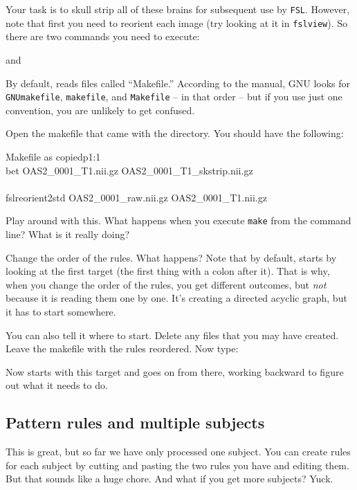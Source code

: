Your task is to skull strip all of these brains for subsequent use by \texttt{FSL}. However, note that first you need to reorient each image (try looking at it in \texttt{fslview}). So there are two commands you need to execute:

and

By default, \maken{} reads files called ``Makefile.'' According to the manual, GNU looks for \texttt{GNUmakefile}, \texttt{makefile}, and \texttt{Makefile} -- in that order -- but if you use just one convention, you are unlikely to get confused. 

Open the makefile that came with the directory. You should have the following:

\begin{make}{Makefile as copied}{p1:1}
	 \\
	\tab bet OAS2_0001_T1.nii.gz OAS2_0001_T1_skstrip.nii.gz \\
	
	\\
	\tab fslreorient2std OAS2_0001_raw.nii.gz OAS2_0001_T1.nii.gz
\end{make}

Play around with this. What happens when you execute \texttt{make} from the command line? What is it really doing?

Change the order of the rules. What happens? Note that by default, \maken{} starts by looking at the first target (the first thing with a colon after it). That is why, when you change the order of the rules, you get different outcomes, but \emph{not} because it is reading them one by one. It's creating a directed acyclic graph, but it has to start somewhere.

You can also tell it where to start. Delete any files that you may have created. Leave the makefile with the rules reordered. Now type:

Now \maken{} starts with this target and goes on from there, working backward to figure out what it needs to do.

\subsection{Pattern rules and multiple subjects}

This is great, but so far we have only processed one subject. You can
create rules for each subject by cutting and pasting the two rules you
have and editing them. But that sounds like a huge chore. And what if
you get more subjects? Yuck.

